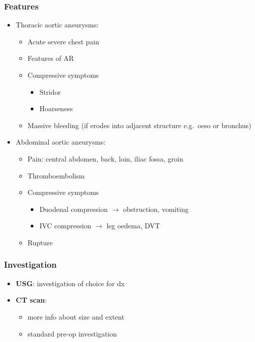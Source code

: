 \documentclass[
  12pt,
]{memoir}
\providecommand{\tightlist}{%
  \setlength{\itemsep}{0pt}\setlength{\parskip}{0pt}}
\begin{document}
\hypertarget{features-3}{%
\subsubsection{Features}\label{features-3}}

\begin{itemize}
\tightlist
\item
  Thoracic aortic aneurysms:

  \begin{itemize}
  \tightlist
  \item
    Acute severe chest pain
  \item
    Features of AR
  \item
    Compressive symptoms

    \begin{itemize}
    \tightlist
    \item
      Stridor
    \item
      Hoarseness
    \end{itemize}
  \item
    Massive bleeding (if erodes into adjacent structure e.g.~oeso or
    bronchus)
  \end{itemize}
\item
  Abdominal aortic aneurysms:

  \begin{itemize}
  \tightlist
  \item
    Pain: central abdomen, back, loin, iliac fossa, groin
  \item
    Thromboembolism
  \item
    Compressive symptoms

    \begin{itemize}
    \tightlist
    \item
      Duodenal compression \(\rightarrow\) obstruction, vomiting
    \item
      IVC compression \(\rightarrow\) leg oedema, DVT
    \end{itemize}
  \item
    Rupture
  \end{itemize}
\end{itemize}

\hypertarget{investigation-4}{%
\subsubsection{Investigation}\label{investigation-4}}

\begin{itemize}
\tightlist
\item
  \textbf{USG}: investigation of choice for dx
\item
  \textbf{CT scan}:

  \begin{itemize}
  \tightlist
  \item
    more info about size and extent
  \item
    standard pre-op investigation
  \end{itemize}
\end{itemize}
\end{document}
